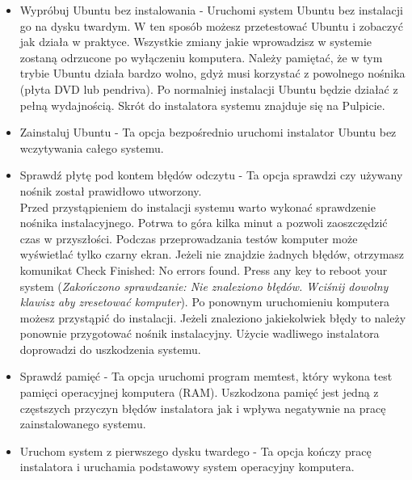 \begin{itemize}
\item \textcolor{ubuntu_orange}{Wypróbuj Ubuntu bez instalowania} - Uruchomi system Ubuntu bez instalacji go na dysku twardym. W ten sposób możesz przetestować Ubuntu i zobaczyć jak działa w praktyce. Wszystkie zmiany jakie wprowadzisz w systemie zostaną odrzucone po wyłączeniu komputera. Należy pamiętać, że w tym trybie Ubuntu działa bardzo wolno, gdyż musi korzystać z powolnego nośnika (płyta DVD lub pendriva). Po normalniej instalacji Ubuntu będzie działać z pełną wydajnością. Skrót do instalatora systemu znajduje się na Pulpicie.
\item \textcolor{ubuntu_orange}{Zainstaluj Ubuntu} - Ta opcja bezpośrednio uruchomi instalator Ubuntu bez wczytywania całego systemu.
\item \textcolor{ubuntu_orange}{Sprawdź płytę pod kontem błędów odczytu} - Ta opcja sprawdzi czy używany nośnik został prawidłowo utworzony.\\
Przed przystąpieniem do instalacji systemu warto wykonać sprawdzenie nośnika instalacyjnego. Potrwa to góra kilka minut a pozwoli zaoszczędzić czas w przyszłości. Podczas przeprowadzania testów komputer może wyświetlać tylko czarny ekran. Jeżeli nie znajdzie żadnych błędów, otrzymasz komunikat \textcolor{ubuntu_orange}{Check Finished: No errors found. Press any key to reboot your system} (\textit{Zakończono sprawdzanie: Nie znaleziono błędów. Wciśnij dowolny klawisz aby zresetować komputer}). Po ponownym uruchomieniu komputera możesz przystąpić do instalacji. Jeżeli znaleziono jakiekolwiek błędy to należy ponownie przygotować nośnik instalacyjny. Użycie wadliwego instalatora doprowadzi do uszkodzenia systemu. 
\item \textcolor{ubuntu_orange}{Sprawdź pamięć} - Ta opcja uruchomi program memtest, który wykona test pamięci operacyjnej komputera (RAM). Uszkodzona pamięć jest jedną z częstszych przyczyn błędów instalatora jak i wpływa negatywnie na pracę zainstalowanego systemu.
\item \textcolor{ubuntu_orange}{Uruchom system z pierwszego dysku twardego} - Ta opcja kończy pracę instalatora i uruchamia podstawowy system operacyjny komputera.
\end{itemize}

